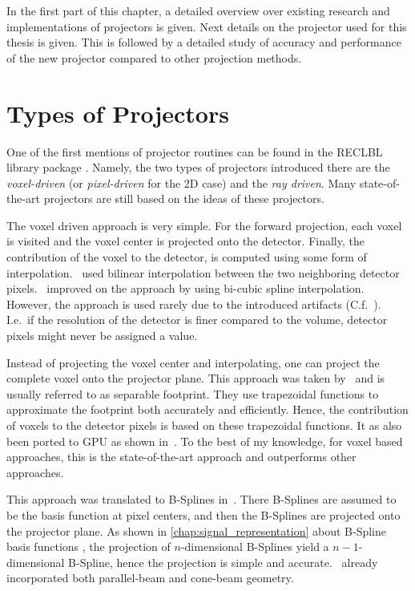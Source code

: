 In the first part of this chapter, a detailed overview over existing research and implementations of
projectors is given. Next details on the projector used for this thesis is given. This is followed
by a detailed study of accuracy and performance of the new projector compared to other projection
methods.

\section{Types of Projectors}\label{sec:projector_types}

One of the first mentions of projector routines can be found in the RECLBL library package
. Namely, the two types of projectors introduced there are the
\textit{voxel-driven} (or \textit{pixel-driven} for the 2D case) and the \textit{ray driven}. Many
state-of-the-art projectors are still based on the ideas of these projectors.

The voxel driven approach is very simple. For the forward projection, each voxel is visited and the
voxel center is projected onto the detector. Finally, the contribution of the voxel to the detector,
is computed using some form of interpolation.~\cite{peters_algorithms_1981} used bilinear
interpolation between the two neighboring detector pixels.~\cite{harauz_interpolation_1983}
improved on the approach by using bi-cubic spline interpolation. However, the approach is used
rarely due to the introduced artifacts (C.f.~\cite[Chapter~3.3]{levakhina_three-dimensional_2014}).
I.e.\ if the resolution of the detector is finer compared to the volume, detector pixels might never
be assigned a value. 

Instead of projecting the voxel center and interpolating, one can project the complete voxel onto
the projector plane. This approach was taken by~\cite{long_3d_2010, long_3d_2010-1} and is usually
referred to as separable footprint. They use trapezoidal functions to approximate the footprint both
accurately and efficiently. Hence, the contribution of voxels to the detector pixels is based on
these trapezoidal functions. It as also been ported to \gls{GPU} as shown in~\cite{wu_gpu_2011,
	xie_effective_2015, chapdelaine_new_2018}. To the best of my knowledge, for voxel based
approaches, this is the state-of-the-art approach and outperforms other approaches.

This approach was translated to B-Splines in~\cite{momey_b-spline_2012, momey_spline_2015}. There
B-Splines are assumed to be the basis function at pixel centers, and then the B-Splines are
projected onto the projector plane. As shown in \autoref{chap:signal_representation} about B-Spline
basis functions , the projection of \(n\)-dimensional B-Splines yield a
\(n-1\)-dimensional B-Spline, hence the projection is simple and
accurate.~\cite{momey_b-spline_2012} already incorporated both parallel-beam and cone-beam geometry.

